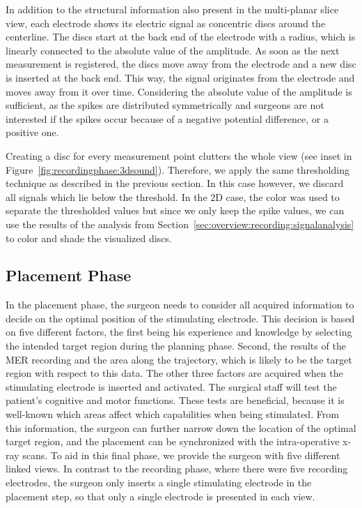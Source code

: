\documentclass{vgtc}                          %
\begin{document}
In addition to the structural information also present in the multi-planar slice view, each electrode shows its electric signal as concentric discs around the centerline. The discs start at the back end of the electrode with a radius, which is linearly connected to the absolute value of the amplitude. As soon as the next measurement is registered, the discs move away from the electrode and a new disc is inserted at the back end. This way, the signal originates from the electrode and moves away from it over time. Considering the absolute value of the amplitude is sufficient, as the spikes are distributed symmetrically and surgeons are not interested if the spikes occur because of a negative potential difference, or a positive one.

Creating a disc for every measurement point clutters the whole view (see inset in Figure~\ref{fig:recordingphase:3dsound}). Therefore, we apply the same thresholding technique as described in the previous section. In this case however, we discard all signals which lie below the threshold. In the 2D case, the color was used to separate the thresholded values but since we only keep the spike values, we can use the results of the analysis from Section~\ref{sec:overview:recording:signalanalysis} to color and shade the visualized discs.


\subsection{Placement Phase}\label{sec:overview:placement}
In the placement phase, the surgeon needs to consider all acquired information to decide on the optimal position of the stimulating electrode. This decision is based on five different factors, the first being his experience and knowledge by selecting the intended target region during the planning phase. Second, the results of the MER recording and the area along the trajectory, which is likely to be the target region with respect to this data. The other three factors are acquired when the stimulating electrode is inserted and activated. The surgical staff will test the patient's cognitive and motor functions. These tests are beneficial, because it is well-known which areas affect which capabilities when being stimulated. From this information, the surgeon can further narrow down the location of the optimal target region, and the placement can be synchronized with the intra-operative x-ray scans. To aid in this final phase, we provide the surgeon with five different linked views. In contrast to the recording phase, where there were five recording electrodes, the surgeon only inserts a single stimulating electrode in the placement step, so that only a single electrode is presented in each view.
\end{document}
